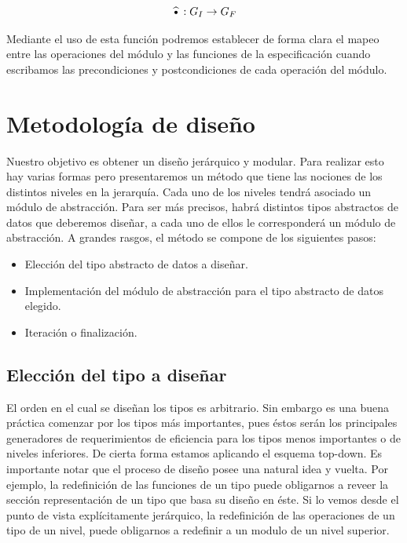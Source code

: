 \begin{equation*}
 \widehat{\text{\textbullet}}: G_I \rightarrow G_F
\end{equation*}

Mediante el uso de esta funci\'on podremos establecer de forma clara el mapeo entre las operaciones del m\'odulo y las funciones de la especificaci\'on cuando escribamos las precondiciones y postcondiciones de cada operaci\'on del m\'odulo.

\newpage

\section{Metodolog\'ia de dise\~no}

Nuestro objetivo es obtener un dise\~no jer\'arquico y modular. Para realizar esto hay varias formas pero presentaremos un m\'etodo que tiene las nociones de los distintos niveles en la jerarqu\'ia. Cada uno de los niveles tendr\'a asociado un m\'odulo de abstracci\'on. Para ser m\'as precisos, habr\'a distintos tipos abstractos de datos que deberemos dise\~nar, a cada uno de ellos le corresponder\'a un m\'odulo de abstracci\'on. A grandes rasgos, el m\'etodo se compone de los siguientes pasos:

\begin{itemize}
 \item Elecci\'on del tipo abstracto de datos a dise\~nar.
 \item Implementaci\'on del m\'odulo de abstracci\'on para el tipo abstracto de datos elegido.
 \item Iteraci\'on o finalizaci\'on.
\end{itemize}

\subsection{Elecci\'on del tipo a dise\~nar}

El orden en el cual se dise\~nan los tipos es arbitrario. Sin embargo es una buena pr\'actica comenzar por los tipos m\'as importantes, pues \'estos ser\'an los principales generadores de requerimientos de eficiencia para los tipos menos importantes o de niveles inferiores. De cierta forma estamos aplicando el esquema top-down. Es importante notar que el proceso de dise\~no posee una natural idea y vuelta. Por ejemplo, la redefinici\'on de las funciones de un tipo puede obligarnos a reveer la secci\'on representaci\'on de un tipo que basa su dise\~no en \'este. Si lo vemos desde el punto de vista expl\'icitamente jer\'arquico, la redefinici\'on de las operaciones de un tipo de un nivel, puede obligarnos a redefinir a un modulo de un nivel superior.


